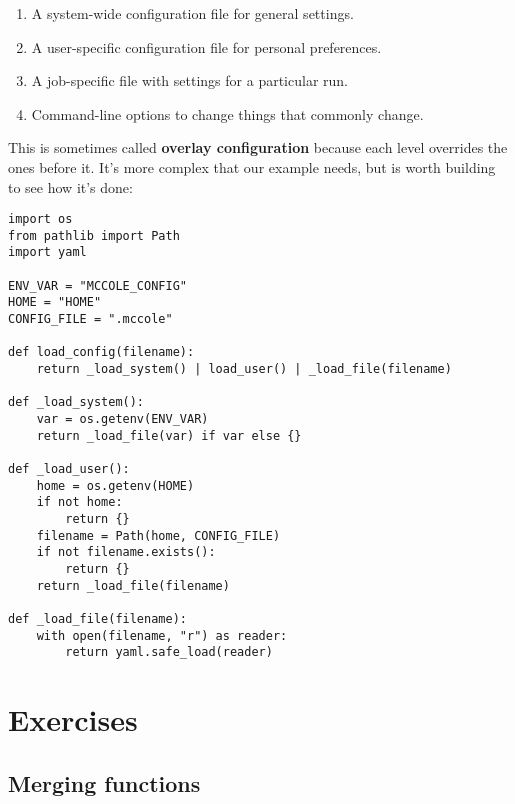 \documentclass{scrbook}
\newcommand{\glossref}[1]{\textbf{#1}}
\begin{document}
\begin{enumerate}

\item 

A system-wide configuration file for general settings.



\item 

A user-specific configuration file for personal preferences.



\item 

A job-specific file with settings for a particular run.



\item 

Command-line options to change things that commonly change.



\end{enumerate}


This is sometimes called \glossref{overlay configuration}
because each level overrides the ones before it.
It's more complex that our example needs,
but is worth building to see how it's done:


\begin{lstlisting}[frame=single,frameround=tttt]
import os
from pathlib import Path
import yaml

ENV_VAR = "MCCOLE_CONFIG"
HOME = "HOME"
CONFIG_FILE = ".mccole"

def load_config(filename):
    return _load_system() | load_user() | _load_file(filename)

def _load_system():
    var = os.getenv(ENV_VAR)
    return _load_file(var) if var else {}

def _load_user():
    home = os.getenv(HOME)
    if not home:
        return {}
    filename = Path(home, CONFIG_FILE)
    if not filename.exists():
        return {}
    return _load_file(filename)

def _load_file(filename):
    with open(filename, "r") as reader:
        return yaml.safe_load(reader)
\end{lstlisting}


\section{Exercises}\label{pipeline-exercises}

\subsection*{Merging functions}
\end{document}
